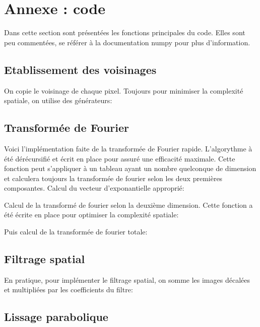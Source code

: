 \documentclass{article}
\begin{document}
\pagebreak

\appendix

\section{Annexe : code}

Dans cette section sont présentées les fonctions principales du code. Elles sont peu commentées, se référer à la documentation numpy pour plus d'information.

\subsection{Etablissement des voisinages}\label{vois}

On copie le voisinage de chaque pixel. Toujours pour minimiser la complexité spatiale, on utilise des générateurs:


\subsection{Transformée de Fourier}\label{four}

Voici l'implémentation faite de la transformée de Fourier rapide. L'algorythme à été dérécursifié et écrit en place pour assuré une efficacité maximale. Cette fonction peut s'appliquer à un tableau ayant un nombre quelconque de dimension et calculera toujours la transformée de fourier selon les deux premières composantes.
Calcul du vecteur d'exponantielle approprié:

Calcul de la transformé de fourier selon la deuxième dimension. Cette fonction a été écrite en place pour optimiser la complexité spatiale:

Puis calcul de la transformée de fourier totale:


\subsection{Filtrage spatial}\label{filt}

En pratique, pour implémenter le filtrage spatial, on somme les images décalées et multipliées par les coefficients du filtre:


\subsection{Lissage parabolique}\label{Parab}
\end{document}
